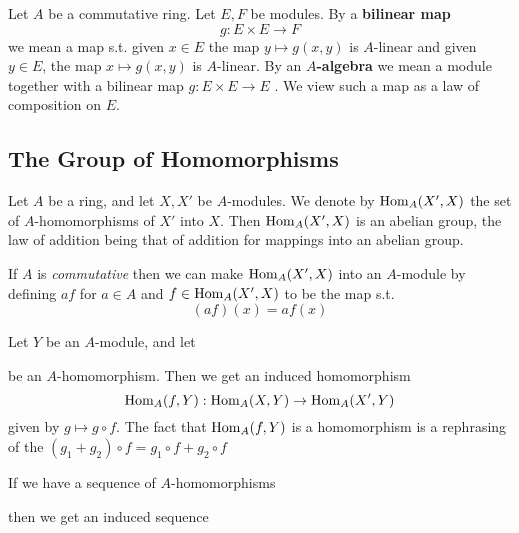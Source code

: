 \documentclass[11pt]{article}
\begin{document}
Let \(A\) be a commutative ring. Let \(E,F\) be modules. By a \textbf{bilinear map}
\begin{equation*}
g:E\times E\to F
\end{equation*}
we mean a map s.t. given \(x\in E\) the map \(y\mapsto g(x,y)\) is \(A\)-linear and given \(y\in E\), the
map \(x\mapsto g(x,y)\) is \(A\)-linear. By an \textbf{\(A\)-algebra} we mean a module together with a bilinear
map \(g:E\times E\to E\) . We view such a map as a law of composition on \(E\).

\subsection{The Group of Homomorphisms}
\label{sec:org80ee62c}
Let \(A\) be a ring, and let \(X,X'\) be \(A\)-modules. We denote by \(\operatorname{Hom}_A(X',X)\) the set
of \(A\)-homomorphisms of \(X'\) into \(X\). Then \(\operatorname{Hom}_A(X',X)\) is an abelian group, the law
of addition being that of addition for mappings into an abelian group.

If \(A\) is \emph{commutative} then we can make \(\operatorname{Hom}_A(X',X)\) into an \(A\)-module by defining \(af\)
for \(a\in A\) and \(f\in\operatorname{Hom}_A(X',X)\) to be the map s.t.
\begin{equation*}
(af)(x)=af(x)
\end{equation*}

Let \(Y\) be an \(A\)-module, and let
\begin{center}\end{center}
be an \(A\)-homomorphism. Then we get an induced homomorphism
\begin{equation*}
\operatorname{Hom}_A(f,Y):\operatorname{Hom}_{A}(X,Y)\to\operatorname{Hom}_A(X',Y)
\end{equation*}
given by \(g\mapsto g\circ f\). The fact that \(\operatorname{Hom}_A(f,Y)\) is a homomorphism is a rephrasing of the
\((g_1+g_2)\circ f=g_1\circ f+g_2\circ f\)

If we have a sequence of \(A\)-homomorphisms
\begin{center}\end{center}
then we get an induced sequence
\begin{center}\end{center}
\end{document}
